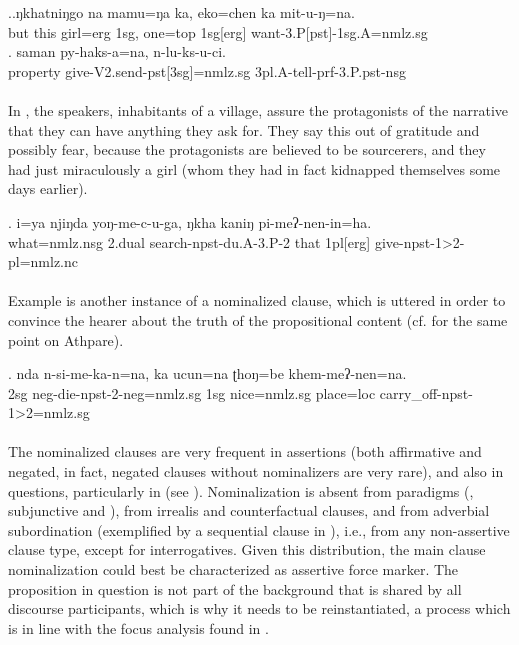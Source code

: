 
\ex.\ag.ŋkhatniŋgo na  mamu=ŋa   ka, eko=chen ka mit-u-ŋ=na.\\ 
	 but  this girl{\sc =erg}  {\sc 1sg}, one{\sc =top} {\sc 1sg[erg]} want{\sc -3.P[pst]-1sg.A=nmlz.sg}\\
\bg. saman   py-haks-a=na,  n-lu-ks-u-ci.\\
property give-V2.send{\sc -pst[3sg]=nmlz.sg} {\sc 3pl.A}-tell{\sc -prf-3.P.pst-nsg}\\
  \\


In \Next, the speakers, inhabitants of a village, assure the protagonists of the narrative that they can have anything they ask for. They say this out of gratitude and possibly fear, because the protagonists are believed to be sourcerers, and they had just miraculously  a girl (whom they had in fact kidnapped themselves some days earlier). 


\exg.  i=ya  njiŋda yoŋ-me-c-u-ga, ŋkha kaniŋ  pi-meʔ-nen-in=ha.\\
what{\sc =nmlz.nsg} {\sc 2.dual} search{\sc -npst-du.A-3.P-2} that {\sc 1pl[erg]}	give-{\sc npst-1>2-pl=nmlz.nc}\\
	 \\
	

Example \Next is another instance of a nominalized clause, which is uttered in order to convince the hearer about the truth of the propositional content (cf. \citet{Ebert1997A-grammar} for the same point on Athpare). 


\exg. nda n-si-me-ka-n=na,  ka ucun=na  ʈhoŋ=be khem-meʔ-nen=na.\\
		{\sc 2sg} {\sc neg}-die-{\sc npst-2-neg=nmlz.sg} {\sc 1sg}  nice{\sc =nmlz.sg} place{\sc =loc} carry\_off-{\sc npst-1>2=nmlz.sg} 	\\
	 \\


The nominalized clauses are very frequent in assertions (both affirmative and negated, in fact, negated clauses without nominalizers are very rare), and also in  questions, particularly in  (see \Next[a]). Nominalization is absent from    paradigms (, subjunctive and ), from irrealis and counterfactual clauses, and from adverbial subordination (exemplified by a sequential clause in \Next[b]), i.e., from any non-assertive clause type, except for interrogatives. Given this distribution, the main clause nominalization could best be characterized as assertive force marker. The proposition in question is not part of the background that is shared by all discourse participants, which is why it needs to be reinstantiated, a process which is in line with the focus analysis found in \citet{Bickel1999Nominalization}. 


